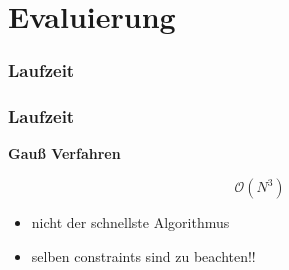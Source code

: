 \section{Evaluierung}

\subsubsection{Laufzeit}
\begin{frame}
    \frametitle{Laufzeit}

    \textbf{Gauß Verfahren}

    $$ \mathcal{O}( N^3 ) $$

    \begin{itemize}
        \item nicht der schnellste Algorithmus
        \item selben constraints sind zu beachten!! 
    \end{itemize}

\end{frame}


